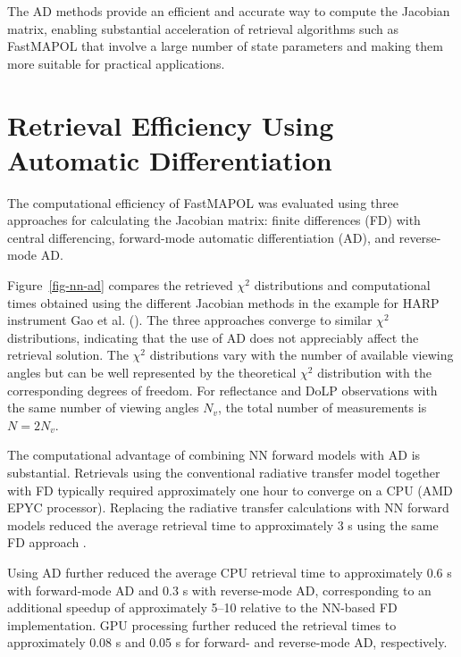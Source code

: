 \documentclass[
  11pt,
  letterpaper,
]{scrreprt}
\begin{document}
The AD methods provide an efficient and accurate way to compute the
Jacobian matrix, enabling substantial acceleration of retrieval
algorithms such as FastMAPOL that involve a large number of state
parameters and making them more suitable for practical applications.

\section{Retrieval Efficiency Using Automatic
Differentiation}\label{retrieval-efficiency-using-automatic-differentiation}

The computational efficiency of FastMAPOL was evaluated using three
approaches for calculating the Jacobian matrix: finite differences (FD)
with central differencing, forward-mode automatic differentiation (AD),
and reverse-mode AD.

Figure~\ref{fig-nn-ad} compares the retrieved \(\chi^2\) distributions
and computational times obtained using the different Jacobian methods in
the example for HARP instrument Gao et al.
(). The three approaches converge to
similar \(\chi^2\) distributions, indicating that the use of AD does not
appreciably affect the retrieval solution. The \(\chi^2\) distributions
vary with the number of available viewing angles but can be well
represented by the theoretical \(\chi^2\) distribution with the
corresponding degrees of freedom. For reflectance and DoLP observations
with the same number of viewing angles \(N_v\), the total number of
measurements is \(N = 2N_v\).

The computational advantage of combining NN forward models with AD is
substantial. Retrievals using the conventional radiative transfer model
together with FD typically required approximately one hour to converge
on a CPU (AMD EPYC processor). Replacing the radiative transfer
calculations with NN forward models reduced the average retrieval time
to approximately 3 s using the same FD approach .

Using AD further reduced the average CPU retrieval time to approximately
0.6 s with forward-mode AD and 0.3 s with reverse-mode AD, corresponding
to an additional speedup of approximately 5--10 relative to the NN-based
FD implementation. GPU processing further reduced the retrieval times to
approximately 0.08 s and 0.05 s for forward- and reverse-mode AD,
respectively.
\end{document}
